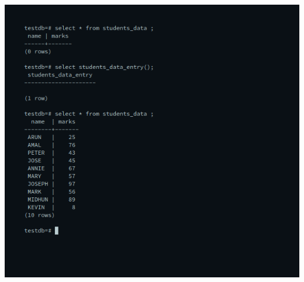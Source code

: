 \documentclass[10pt,a4paper,titlepage]{report}
\begin{document}
{\begin{enumerate}
\begin{verbatim}
	\end{verbatim}
	\includegraphics[width=\linewidth]{../Images/Plsql/5.png}


\end{enumerate}}
\end{document}
